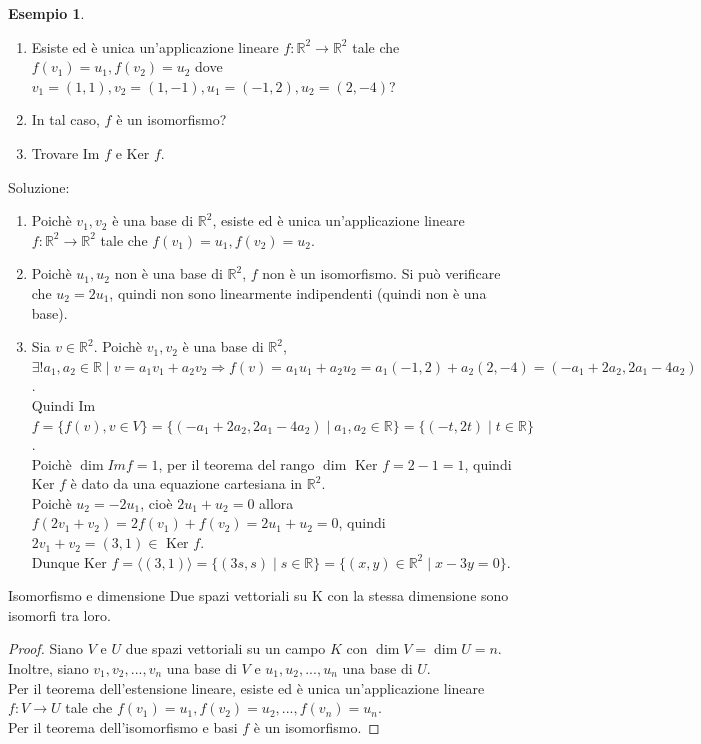 \documentclass[a4paper]{article}
\theoremstyle{definition}
\newtheorem*{es}{Esempio}
\begin{document}
\begin{es}
	\begin{enumerate}
		\item Esiste ed è unica un'applicazione lineare $f: \mathbb{R}^2 \rightarrow \mathbb{R}^2$ tale che $f(v_1) = u_1, f(v_2) = u_2$ dove $v_1 = (1, 1), v_2 = (1, -1), u_1 = (-1, 2), u_2 = (2, -4)$?
		\item In tal caso, $f$ è un isomorfismo?
		\item Trovare Im $f$ e Ker $f$.
	\end{enumerate}
	Soluzione:
	\begin{enumerate}
		\item Poichè $v_1, v_2$ è una base di $\mathbb{R}^2$, esiste ed è unica un'applicazione lineare $f: \mathbb{R}^2 \rightarrow \mathbb{R}^2$ tale che $f(v_1) = u_1, f(v_2) = u_2$.
		\item Poichè $u_1, u_2$ non è una base di $\mathbb{R}^2$, $f$ non è un isomorfismo. Si può verificare che $u_2 = 2u_1$, quindi non sono linearmente indipendenti (quindi non è una base).
		\item Sia $v \in \mathbb{R}^2$. Poichè $v_1, v_2$ è una base di $\mathbb{R}^2$, $\exists! a_1, a_2 \in \mathbb{R} \mid v = a_1v_1 + a_2v_2 \Rightarrow f(v) = a_1u_1 + a_2u_2 = a_1(-1, 2) + a_2(2, -4) = (-a_1 + 2a_2, 2a_1 - 4a_2)$. \\
		      Quindi Im $f = \{f(v), v \in V\} = \{(-a_1 + 2a_2, 2a_1 - 4a_2) \mid a_1, a_2 \in \mathbb{R}\} = \{(-t, 2t) \mid t \in \mathbb{R}\}$. \\
		      Poichè $\dim Im f = 1$, per il teorema del rango $\dim$ Ker $f = 2 - 1 = 1$, quindi Ker $f$ è dato da una equazione cartesiana in $\mathbb{R}^2$. \\
		      Poichè $u_2 = -2u_1$, cioè $2u_1 + u_2 = 0$ allora $f(2v_1 + v_2) = 2f(v_1) + f(v_2) = 2u_1 + u_2 = 0$, quindi $2v_1 + v_2 = (3, 1) \in$ Ker $f$. \\
		      Dunque Ker $f = \langle (3, 1) \rangle = \{(3s, s) \mid s \in \mathbb{R}\} = \{(x, y) \in \mathbb{R}^2 \mid x - 3y = 0\}$.
	\end{enumerate}
\end{es}

\begin{cor}{Isomorfismo e dimensione}{}
	Due spazi vettoriali su K con la stessa dimensione sono isomorfi tra loro.
\end{cor}
\begin{proof}
	Siano $V$ e $U$ due spazi vettoriali su un campo $K$ con $\dim V = \dim U = n$.
	Inoltre, siano $v_1, v_2, ..., v_n$ una base di $V$ e $u_1, u_2, ..., u_n$ una base di $U$. \\
	Per il teorema dell'estensione lineare, esiste ed è unica un'applicazione lineare $f: V \rightarrow U$ tale che $f(v_1) = u_1, f(v_2) = u_2, ..., f(v_n) = u_n$. \\
	Per il teorema dell'isomorfismo e basi $f$ è un isomorfismo.
\end{proof}
\end{document}
